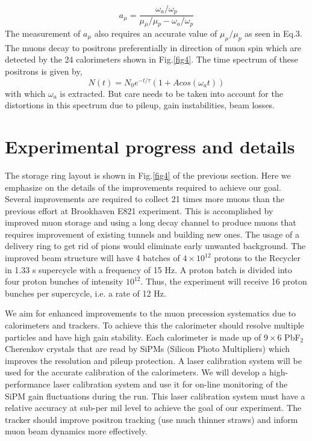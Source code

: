 \documentclass{article}
\begin{document}
\begin{equation}
\label{frequecy}
a_{\mu} = \frac{\omega{_a} / \omega{_p}}{\mu{_\mu} / \mu{_p}-\omega{_a} / \omega{_p}}
\end{equation}
 The measurement of $a_{\mu}$ also requires an accurate value of $\mu_{\mu}/\mu_p$
as seen in Eq.3. The muons decay to positrons preferentially in direction of muon spin which are
detected by the 24 calorimeters shown in Fig.\ref{fig4}. The time spectrum of these positrons is given
by,
\begin{equation}
N(t) = N_{0}e^{-t/\tau} (1 + A cos(\omega{_a}t))
\end{equation}
with which $\omega{_a}$ is extracted. But care needs to be taken into account
for the distortions in this spectrum due to pileup, gain instabilities, beam losses. 
\section{Experimental progress and details}
The storage ring layout is shown in Fig.\ref{fig4} of the previous section.
Here we emphasize on the details of the improvements required to achieve our goal. 
Several improvements are required to collect 21 times more
muons than the previous effort at Brookhaven E821 experiment.
This is accomplished by improved muon storage and 
using a long decay channel to produce muons that requires
improvement of existing tunnels and building 
new ones. The usage of a delivery ring to get rid of pions would 
eliminate early unwanted background. 
The improved beam structure will have 4 batches of
$4 \times 10^{12}$ protons to the Recycler in 1.33 s supercycle with a frequency of 15 Hz.
A proton batch is divided into four proton bunches of intensity $10^{12}$. Thus, the experiment
will receive 16 proton bunches per supercycle, i.e. a rate of 12 Hz.%

We aim for enhanced improvements to the muon precession systematics due to calorimeters
and trackers. To achieve this the calorimeter should resolve multiple particles and
have high gain stability. Each calorimeter is made up of $9\times6$ PbF$_2$ Cherenkov
crystals that are read by SiPMs (Silicon Photo Multipliers) which improves the
resolution and pileup protection. 
A laser calibration system will be used 
for the accurate calibration of the calorimeters. We will develop a high-performance laser
calibration system and use it for on-line monitoring of the SiPM gain fluctuations
during the run.
This laser calibration system must have a relative accuracy at sub-per mil level to achieve the
goal of our experiment. 
The tracker should improve positron tracking (use much thinner straws) and
inform muon beam dynamics more effectively. 
\end{document}
